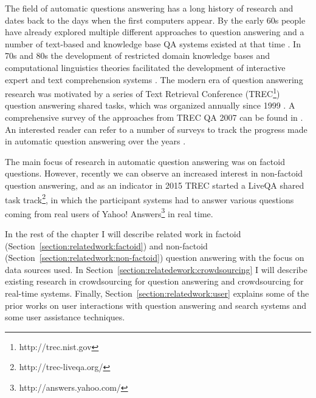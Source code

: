%

\label{chapter:related}

\noindent

The field of automatic questions answering has a long history of research and dates back to the days when the first computers appear.
By the early 60s people have already explored multiple different approaches to question answering and a number of text-based and knowledge base QA systems existed at that time \cite{Simmons:1965:AEQ:363707.363732,Simmons:1970:NLQ:361953.361963}.
In 70s and 80s the development of restricted domain knowledge bases and computational linguistics theories facilitated the development of interactive expert and text comprehension systems \cite{androutsopoulos1995natural,shortliffe1975model,woods1977lunar,wilensky1988berkeley}.
The modern era of question answering research was motivated by a series of Text Retrieval Conference (TREC\footnote{http://trec.nist.gov}) question answering shared tasks, which was organized annually since 1999 \cite{voorhees2001trec}.
A comprehensive survey of the approaches from TREC QA 2007 can be found in \cite{dang2007overview}.
An interested reader can refer to a number of surveys to track the progress made in automatic question answering over the years  \cite{hirschman2001natural,andrenucci2005automated,wang2006survey,Kolomiyets:2011:SQA:2046840.2047162,prager2006open,allam2012question,gupta2012survey}.

The main focus of research in automatic question answering was on factoid questions.
However, recently we can observe an increased interest in non-factoid question answering, and as an indicator in 2015 TREC started a LiveQA shared task track\footnote{http://trec-liveqa.org/}, in which the participant systems had to answer various questions coming from real users of Yahoo! Answers\footnote{http://answers.yahoo.com/} in real time.

In the rest of the chapter I will describe related work in factoid (Section~\ref{section:relatedwork:factoid}) and non-factoid (Section~\ref{section:relatedwork:non-factoid}) question answering with the focus on data sources used.
In Section~\ref{section:relatedework:crowdsourcing} I will describe existing research in crowdsourcing for question answering and crowdsourcing for real-time systems.
Finally, Section~\ref{section:relatedwork:user} explains some of the prior works on user interactions with question answering and search systems and some user assistance techniques.

